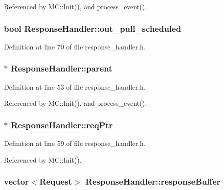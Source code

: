 Referenced by MC::Init(), and process\_\-event().
\subsubsection[{out\_\-pull\_\-scheduled}]{\setlength{\rightskip}{0pt plus 5cm}bool {\bf ResponseHandler::out\_\-pull\_\-scheduled}\hspace{0.3cm}{\tt  [private]}}\label{classResponseHandler_d198bc0b1d6902077d52d18f0efb3729}




Definition at line 70 of file response\_\-handler.h.
\subsubsection[{parent}]{$\ast$ {\bf ResponseHandler::parent}}\label{classResponseHandler_250c7dee041c1f3738cc53ab1dd90959}




Definition at line 53 of file response\_\-handler.h.

Referenced by MC::Init(), and process\_\-event().
\subsubsection[{reqPtr}]{$\ast$ {\bf ResponseHandler::reqPtr}}\label{classResponseHandler_b78b1fc886d81671e1353060f6cbe8c7}




Definition at line 59 of file response\_\-handler.h.

Referenced by MC::Init().
\subsubsection[{responseBuffer}]{\setlength{\rightskip}{0pt plus 5cm}vector$<${\bf Request}$>$ {\bf ResponseHandler::responseBuffer}}\label{classResponseHandler_dcc85fb70179625c54862c39e6fe6fac}




